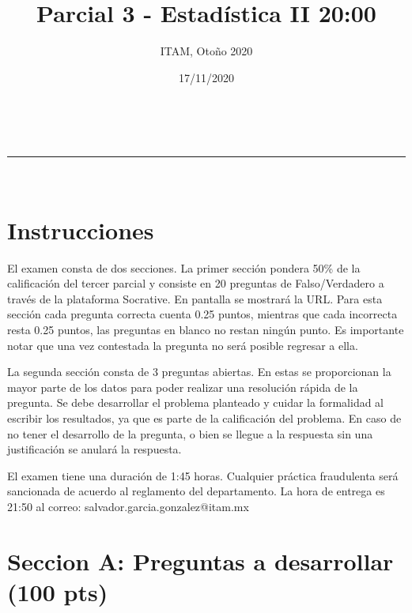 \documentclass[addpoints]{exam}
\makeatletter
\newcommand{\linia}{\rule{\linewidth}{0.5pt}}
\theoremstyle{mytheor}
\renewcommand{\maketitle}{
    \begin{center}
    \vspace{2ex}
    {\huge \textsc{\@title}}
    \vspace{1ex}
    \\
    \linia\\
    \@author \hfill \@date
    \vspace{4ex}
    \end{center}
  }
\makeatother
\begin{document}
  
  \title{Parcial 3 - Estadística II 20:00 }
  
  \author{ITAM, Otoño 2020}
  
  \date{17/11/2020}
  
  \maketitle
  
  \section*{Instrucciones}
  
El examen consta de dos secciones. La primer sección pondera 50\% de la calificación del tercer parcial y consiste en 20 preguntas de Falso/Verdadero a través de la plataforma Socrative. En pantalla se mostrará la URL. Para esta sección cada pregunta correcta cuenta 0.25 puntos, mientras que cada incorrecta resta 0.25 puntos, las preguntas en blanco no restan ningún punto. Es importante notar que una vez contestada la pregunta no será posible regresar a ella. 
 
 \vspace{10pt}
 
La segunda sección consta de 3 preguntas abiertas. En estas se proporcionan la mayor parte de los datos para poder realizar una resolución rápida de la pregunta. Se debe desarrollar el problema planteado y cuidar la formalidad al escribir los resultados, ya que es parte de la calificación del problema. En caso de no tener el desarrollo de la pregunta, o bien se llegue a la respuesta sin una justificación se anulará la respuesta. 

\vspace{10pt}
  
El examen tiene una duración de 1:45 horas. Cualquier práctica fraudulenta será sancionada de acuerdo al reglamento del departamento. La hora de entrega es 21:50 al correo: salvador.garcia.gonzalez@itam.mx

\section*{Seccion A: Preguntas a desarrollar (100 pts)}
  
\end{document}
